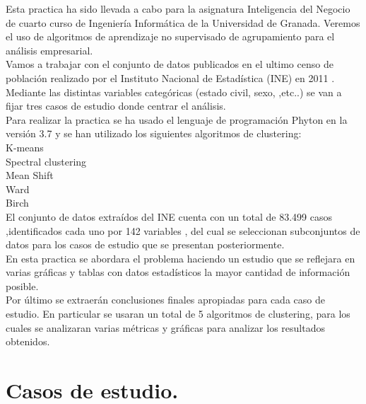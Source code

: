 	Esta practica ha sido llevada a cabo para la asignatura Inteligencia del Negocio de cuarto
	curso de Ingeniería Informática de la Universidad de Granada. Veremos el uso de algoritmos de aprendizaje
	no supervisado de agrupamiento para el análisis empresarial.\\

	Vamos a trabajar con el conjunto de datos publicados en el ultimo censo de población realizado por 
	el Instituto Nacional de Estadística (INE) en 2011 \cite{cite1}. \\

	Mediante las distintas variables categóricas (estado civil, sexo,
	,etc..) se van a fijar tres casos de estudio donde centrar el análisis. \\

	Para realizar la practica se ha usado el lenguaje de programación Phyton en la versión 3.7 \cite{cite2}
	y se han utilizado los siguientes algoritmos de clustering: \\

	K-means  \cite{cite3} \\
	Spectral clustering \cite{cite5} \\
	Mean Shift \cite{cite6} \\
	Ward \cite{cite7} \\
	Birch \cite{cite9} \\

	El conjunto de datos extraídos del INE cuenta con un total de 83.499 casos ,identificados 
	cada uno por 142 variables , del cual se seleccionan subconjuntos de datos para los casos de 
	estudio que se presentan posteriormente.\\

	En esta practica se abordara el problema haciendo un estudio que se reflejara en varias gráficas
	y tablas con datos estadísticos la mayor cantidad de información posible.\\

	Por último se extraerán conclusiones finales apropiadas para cada caso de estudio. En particular
	se usaran un total de 5 algoritmos de clustering, para los cuales se analizaran varias métricas y gráficas
	para analizar los resultados obtenidos.


	\section[Casos de estudio]{Casos de estudio.}

